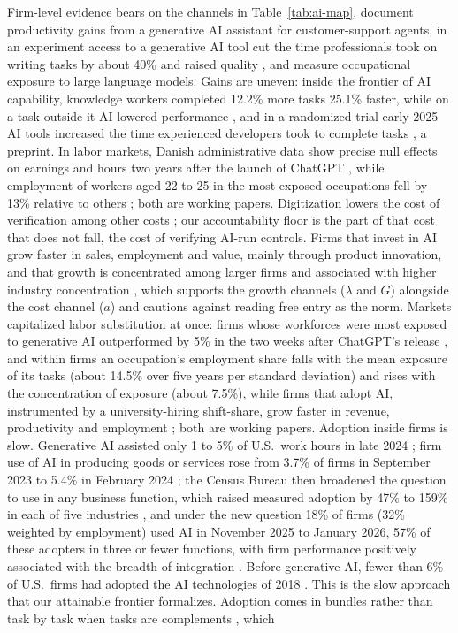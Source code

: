Firm-level evidence bears on the channels in Table~\ref{tab:ai-map}. \citet{brynjolfsson2025generative} document productivity gains from a generative AI assistant for customer-support agents, in an experiment access to a generative AI tool cut the time professionals took on writing tasks by about 40\% and raised quality \citep{noy2023experimental}, and \citet{eloundou2024gpts} measure occupational exposure to large language models. Gains are uneven: inside the frontier of AI capability, knowledge workers completed 12.2\% more tasks 25.1\% faster, while on a task outside it AI lowered performance \citep{dellacqua2026navigating}, and in a randomized trial early-2025 AI tools increased the time experienced developers took to complete tasks \citep{becker2025measuring}, a preprint. In labor markets, Danish administrative data show precise null effects on earnings and hours two years after the launch of ChatGPT \citep{humlum2025still}, while employment of workers aged 22 to 25 in the most exposed occupations fell by 13\% relative to others \citep{brynjolfsson2025canaries}; both are working papers. Digitization lowers the cost of verification among other costs \citep{goldfarb2019digital}; our accountability floor is the part of that cost that does not fall, the cost of verifying AI-run controls. Firms that invest in AI grow faster in sales, employment and value, mainly through product innovation, and that growth is concentrated among larger firms and associated with higher industry concentration \citep{babina2024artificial}, which supports the growth channels ($\lambda$ and $G$) alongside the cost channel ($a$) and cautions against reading free entry as the norm. Markets capitalized labor substitution at once: firms whose workforces were most exposed to generative AI outperformed by 5\% in the two weeks after ChatGPT's release \citep{eisfeldt2023generative}, and within firms an occupation's employment share falls with the mean exposure of its tasks (about 14.5\% over five years per standard deviation) and rises with the concentration of exposure (about 7.5\%), while firms that adopt AI, instrumented by a university-hiring shift-share, grow faster in revenue, productivity and employment \citep{hampole2025artificial}; both are working papers. Adoption inside firms is slow. Generative AI assisted only 1 to 5\% of U.S.\ work hours in late 2024 \citep{bick2026rapid}; firm use of AI in producing goods or services rose from 3.7\% of firms in September 2023 to 5.4\% in February 2024 \citep{bonney2024tracking}; the Census Bureau then broadened the question to use in any business function, which raised measured adoption by 47\% to 159\% in each of five industries \citep{allen2026monitoring,census2025btoswording}, and under the new question 18\% of firms (32\% weighted by employment) used AI in November 2025 to January 2026, 57\% of these adopters in three or fewer functions, with firm performance positively associated with the breadth of integration \citep{bonney2026microstructure}. Before generative AI, fewer than 6\% of U.S.\ firms had adopted the AI technologies of 2018 \citep{mcelheran2024ai}. This is the slow approach that our attainable frontier formalizes. Adoption comes in bundles rather than task by task when tasks are complements \citep{agrawal2024artificial,gans2026oring}, which 